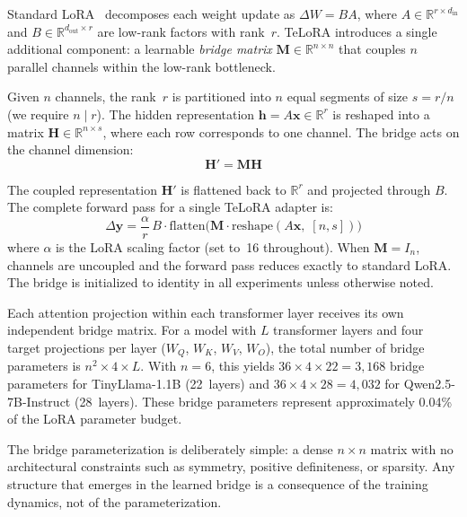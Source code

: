 \documentclass[11pt]{article}
\begin{document}
Standard LoRA~\cite{hu2022lora} decomposes each weight update as
$\Delta W = BA$, where $A \in \mathbb{R}^{r \times d_{\text{in}}}$
and $B \in \mathbb{R}^{d_{\text{out}} \times r}$ are low-rank factors
with rank~$r$. TeLoRA introduces a single additional component: a
learnable \emph{bridge matrix}
$\mathbf{M} \in \mathbb{R}^{n \times n}$ that couples $n$ parallel
channels within the low-rank bottleneck.

Given $n$ channels, the rank~$r$ is partitioned into $n$ equal
segments of size $s = r/n$ (we require $n \mid r$). The hidden
representation $\mathbf{h} = A\mathbf{x} \in \mathbb{R}^r$ is
reshaped into a matrix $\mathbf{H} \in \mathbb{R}^{n \times s}$,
where each row corresponds to one channel. The bridge acts on the
channel dimension:
%
\begin{equation}
  \mathbf{H}' = \mathbf{M} \mathbf{H}
\end{equation}

The coupled representation $\mathbf{H}'$ is flattened back to
$\mathbb{R}^r$ and projected through $B$. The complete forward pass
for a single TeLoRA adapter is:
%
\begin{equation}
  \Delta \mathbf{y} = \frac{\alpha}{r}\, B \cdot
    \mathrm{flatten}\!\bigl(\mathbf{M} \cdot
    \mathrm{reshape}(A\mathbf{x},\; [n, s])\bigr)
\end{equation}
%
where $\alpha$ is the LoRA scaling factor (set to~16 throughout). When
$\mathbf{M} = I_n$, channels are uncoupled and the forward pass
reduces exactly to standard LoRA. The bridge is initialized to
identity in all experiments unless otherwise noted.

Each attention projection within each transformer layer receives its
own independent bridge matrix. For a model with $L$ transformer layers
and four target projections per layer ($W_Q$, $W_K$, $W_V$, $W_O$),
the total number of bridge parameters is $n^2 \times 4 \times L$.
With $n = 6$, this yields $36 \times 4 \times 22 = 3{,}168$ bridge
parameters for TinyLlama-1.1B (22~layers) and
$36 \times 4 \times 28 = 4{,}032$ for Qwen2.5-7B-Instruct
(28~layers). These bridge parameters represent approximately 0.04\%
of the LoRA parameter budget.

The bridge parameterization is deliberately simple: a dense
$n \times n$ matrix with no architectural constraints such as
symmetry, positive definiteness, or sparsity. Any structure that
emerges in the learned bridge is a consequence of the training
dynamics, not of the parameterization.
\end{document}
